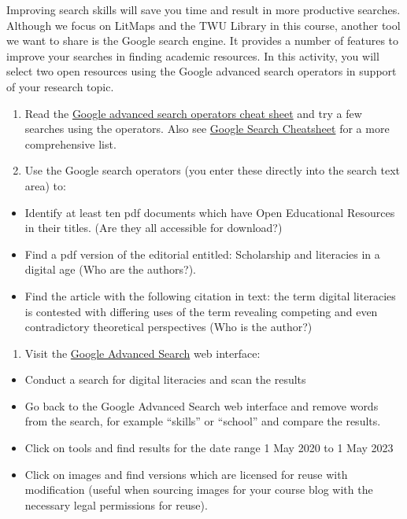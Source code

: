 \documentclass[
]{book}
\providecommand{\tightlist}{%
  \setlength{\itemsep}{0pt}\setlength{\parskip}{0pt}}
\theoremstyle{definition}
\theoremstyle{definition}
\theoremstyle{definition}
\theoremstyle{definition}
\theoremstyle{remark}
\begin{document}
\begin{reflect}
Improving search skills will save you time and result in more productive searches. Although we focus on LitMaps and the TWU Library in this course, another tool we want to share is the Google search engine. It provides a number of features to improve your searches in finding academic resources.
In this activity, you will select two open resources using the Google advanced search operators in support of your research topic.

\begin{enumerate}
\def\labelenumi{\arabic{enumi}.}
\tightlist
\item
  Read the \href{https://www.webfx.com/blog/seo/google-advanced-search-operators-cheat-sheet/}{Google advanced search operators cheat sheet} and try a few searches using the operators. Also see \href{https://quickref.me/google-search.html}{Google Search Cheatsheet} for a more comprehensive list.\\
\item
  Use the Google search operators (you enter these directly into the search text area) to:\\
\end{enumerate}

\begin{itemize}
\tightlist
\item
  Identify at least ten pdf documents which have Open Educational Resources in their titles. (Are they all accessible for download?)\\
\item
  Find a pdf version of the editorial entitled: Scholarship and literacies in a digital age (Who are the authors?).\\
\item
  Find the article with the following citation in text: the term digital literacies is contested with differing uses of the term revealing competing and even contradictory theoretical perspectives (Who is the author?)\\
\end{itemize}

\begin{enumerate}
\def\labelenumi{\arabic{enumi}.}
\tightlist
\item
  Visit the \href{https://www.google.com/advanced_search}{Google Advanced Search} web interface:\\
\end{enumerate}

\begin{itemize}
\tightlist
\item
  Conduct a search for digital literacies and scan the results
\item
  Go back to the Google Advanced Search web interface and remove words from the search, for example ``skills'' or ``school'' and compare the results.
\item
  Click on tools and find results for the date range 1 May 2020 to 1 May 2023
\item
  Click on images and find versions which are licensed for reuse with modification (useful when sourcing images for your course blog with the necessary legal permissions for reuse).
\end{itemize}


\end{reflect}
\end{document}
